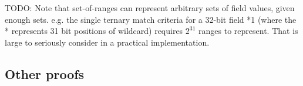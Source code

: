 \documentclass[acmsmall]{acmart}
\newcommand{\todo}[1]{}
\renewcommand{\todo}[1]{{\color{red} TODO: {#1}}}
\begin{document}
\todo{Note that set-of-ranges can represent arbitrary sets of field values, given enough sets.  e.g. the single ternary match criteria for a 32-bit field *1 (where the * represents 31 bit positions of wildcard) requires $2^{31}$ ranges to represent.  That is large to seriously consider in a practical implementation.}


\subsection{Other proofs}

\begin{theorem}
\label{thm:addnewfilterpreservesclosedunderintersection}
\end{theorem}
\end{document}
